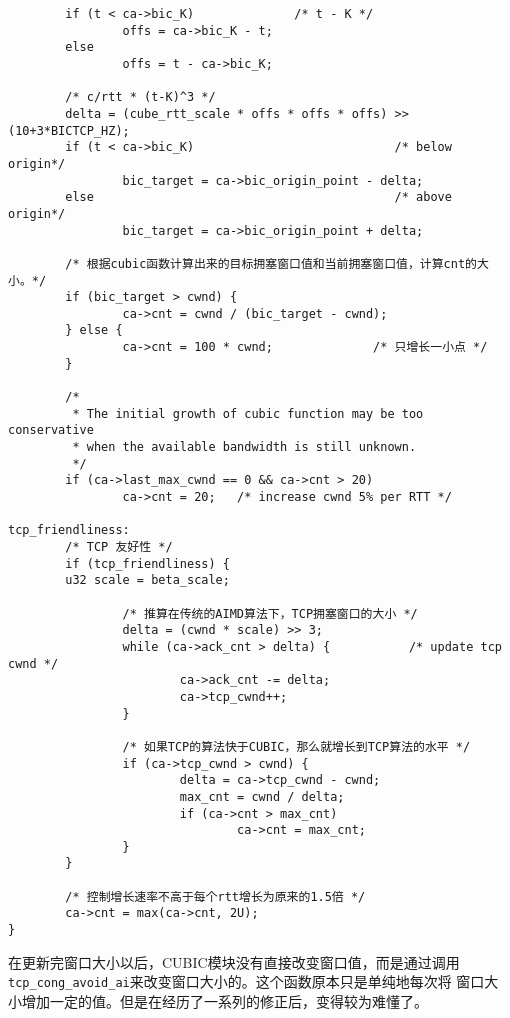 \begin{verbatim}
        if (t < ca->bic_K)              /* t - K */
                offs = ca->bic_K - t;
        else
                offs = t - ca->bic_K;

        /* c/rtt * (t-K)^3 */
        delta = (cube_rtt_scale * offs * offs * offs) >> (10+3*BICTCP_HZ);
        if (t < ca->bic_K)                            /* below origin*/
                bic_target = ca->bic_origin_point - delta;
        else                                          /* above origin*/
                bic_target = ca->bic_origin_point + delta;

        /* 根据cubic函数计算出来的目标拥塞窗口值和当前拥塞窗口值，计算cnt的大小。*/
        if (bic_target > cwnd) {
                ca->cnt = cwnd / (bic_target - cwnd);
        } else {
                ca->cnt = 100 * cwnd;              /* 只增长一小点 */
        }

        /*
         * The initial growth of cubic function may be too conservative
         * when the available bandwidth is still unknown.
         */
        if (ca->last_max_cwnd == 0 && ca->cnt > 20)
                ca->cnt = 20;   /* increase cwnd 5% per RTT */

tcp_friendliness:
        /* TCP 友好性 */
        if (tcp_friendliness) {
        u32 scale = beta_scale;

                /* 推算在传统的AIMD算法下，TCP拥塞窗口的大小 */
                delta = (cwnd * scale) >> 3;
                while (ca->ack_cnt > delta) {           /* update tcp cwnd */
                        ca->ack_cnt -= delta;
                        ca->tcp_cwnd++;
                }
                
                /* 如果TCP的算法快于CUBIC，那么就增长到TCP算法的水平 */
                if (ca->tcp_cwnd > cwnd) {
                        delta = ca->tcp_cwnd - cwnd;
                        max_cnt = cwnd / delta;
                        if (ca->cnt > max_cnt)
                                ca->cnt = max_cnt;
                }
        }

        /* 控制增长速率不高于每个rtt增长为原来的1.5倍 */
        ca->cnt = max(ca->cnt, 2U);
}
\end{verbatim}
在更新完窗口大小以后，CUBIC模块没有直接改变窗口值，而是通过调用
\texttt{tcp_cong_avoid_ai}来改变窗口大小的。这个函数原本只是单纯地每次将
窗口大小增加一定的值。但是在经历了一系列的修正后，变得较为难懂了。
